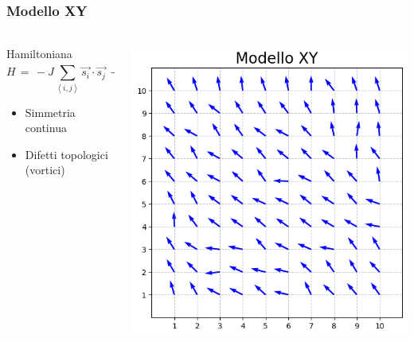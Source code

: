 \begin{frame}
    \frametitle{Modello XY}
    \framesubtitle{}

    \begin{columns}

        \begin{column}{0.55\textwidth}

            \begin{block}{Hamiltoniana}
			    \begin{equation*}
                    H\,=\,-J\sum_{\left<i,j\right>}\vec{s_i} \cdot \vec{s_j}\,-\,\sum_i \vec{h} \cdot \vec{s_i} 
				    \label{eq: magn_Ising2D_AS}
			    \end{equation*}
            \end{block}

            \vspace{0.5cm}

			\begin{itemize}[itemsep=0.5em, label=$\diamond$]
                \item Simmetria continua
                \item Difetti topologici (vortici)
            \end{itemize}

        \end{column}
        
        \vspace{0.3cm}

        \begin{column}{0.45\textwidth}
			
			\centering
            \includegraphics[width=\textwidth]{Immagini/Introduzione/modelloXY.png}
        

\end{column}
\end{columns}
\end{frame}
